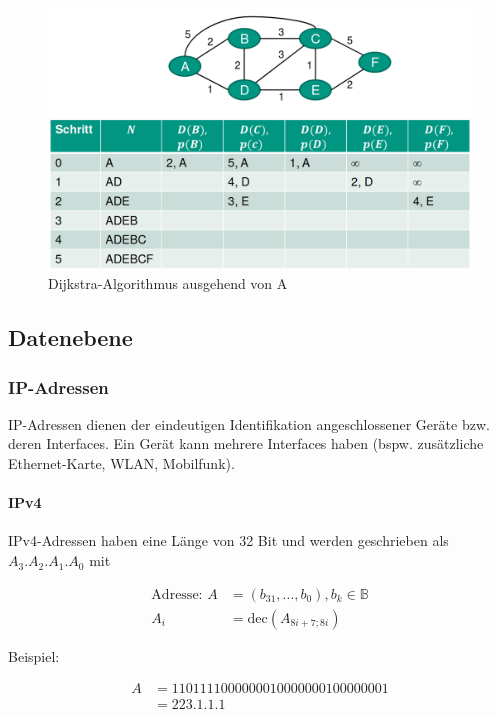 \documentclass[a4paper, 14pt]{article}
\begin{document}
	\begin{figure}
		\includegraphics[width=\textwidth]{images/05-link-state-dijkstra.png}
		\caption{Dijkstra-Algorithmus ausgehend von A}
	\end{figure}

	\subsection{Datenebene}

	\subsubsection{IP-Adressen}

	IP-Adressen dienen der eindeutigen Identifikation angeschlossener Geräte bzw. deren Interfaces.
	Ein Gerät kann mehrere Interfaces haben (bspw. zusätzliche Ethernet-Karte, WLAN, Mobilfunk).

	\paragraph{IPv4}

	IPv4-Adressen haben eine Länge von 32 Bit und werden geschrieben als $A_3 . A_2 . A_1 . A_0$ mit

	\begin{align*}
		\text{Adresse: } A &= (b_{31}, ..., b_0), b_k \in \mathbb{B} \\
		A_i &= \text{dec}(A_{8i + 7; 8i})
	\end{align*}

	Beispiel:

	\begin{align*}
		A &= 1101111 00000001 00000001 00000001 \\
		&= 223.1.1.1
	\end{align*}
\end{document}
